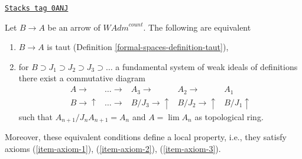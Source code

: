 \begin{lemma}
\label{formal-spaces-lemma-representable-property-rings}
\href{https://stacks.math.columbia.edu/tag/0ANJ}{\texttt{Stacks tag 0ANJ}}

Let $B \to A$ be an arrow of $\textit{WAdm}^{count}$.
The following are equivalent
\begin{enumerate}
\item[(a)] $B \to A$ is taut (Definition \ref{formal-spaces-definition-taut}),
\item[(b)] for $B \supset J_1 \supset J_2 \supset J_3 \supset \ldots$
a fundamental system of weak ideals of definitions there exist
a commutative diagram
$$
\begin{array}{ccccc}A \longrightarrow & \ldots \longrightarrow & A_3 \longrightarrow & A_2 \longrightarrow & A_1 \\ B \longrightarrow\uparrow & \ldots \longrightarrow & B/J_3 \longrightarrow\uparrow & B/J_2 \longrightarrow\uparrow & B/J_1 \uparrow\end{array}
$$
such that $A_{n + 1}/J_nA_{n + 1} = A_n$ and $A = \lim A_n$
as topological ring.
\end{enumerate}
Moreover, these equivalent conditions define a local property,
i.e., they satisfy axioms (\ref{item-axiom-1}), (\ref{item-axiom-2}),
(\ref{item-axiom-3}).
\end{lemma}

